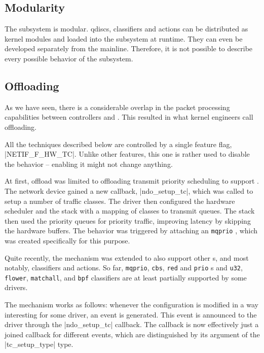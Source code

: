 \subsection{Modularity}

The  subsystem is modular. \Acrshort{qdisc}s, classifiers and actions
can be distributed as kernel modules and loaded into the subsystem at runtime.
They can even be developed separately from the mainline. Therefore, it is not
possible to describe every possible behavior of the subsystem.

\subsection{Offloading}

As we have seen, there is a considerable overlap in the packet processing
capabilities between controllers and . This resulted in what kernel
engineers call  offloading.

All the techniques described below are controlled by a single feature flag,
\macro|NETIF_F_HW_TC|. Unlike other features, this one is rather used to
disable the behavior -- enabling it might not change anything.

At first,  offload was limited to offloading transmit priority scheduling
to support  \cite{linux-hw-qos}. The network device gained a new
callback, \fnc|ndo_setup_tc|, which was called to setup a number of traffic
classes. The driver then configured the hardware scheduler and the stack with
a mapping of classes to transmit queues. The stack then used the priority
queues for priority traffic, improving latency by skipping the hardware
buffers. The behavior was triggered by attaching an \texttt{mqprio} \qdisc,
which was created specifically for this purpose.

Quite recently, the mechanism was extended to also support other \qdisc{}s, and
most notably, classifiers and actions. So far, \texttt{mqprio}, \texttt{cbs},
\texttt{red} and \texttt{prio} \qdisc{}s and \texttt{u32}, \texttt{flower},
\texttt{matchall}, and \texttt{bpf} classifiers are at least partially
supported by some drivers.

The mechanism works as follows: whenever the  configuration is modified in
a way interesting for some driver, an event is generated. This event is
announced to the driver through the \fnc|ndo_setup_tc| callback. The callback
is now effectively just a joined callback for different events, which are
distinguished by its argument of the \struct|tc_setup_type| type.

